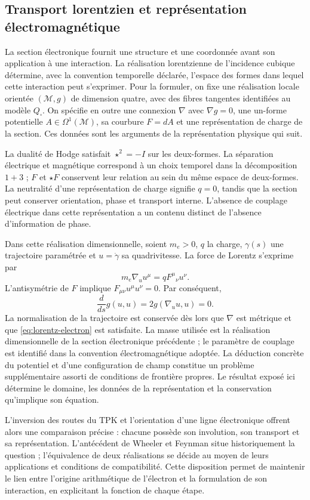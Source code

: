 \newpage
\subsection{Transport lorentzien et représentation électromagnétique}

La section électronique fournit une structure et une coordonnée
avant son application à une interaction. La réalisation lorentzienne
de l'incidence cubique détermine, avec la convention temporelle déclarée,
l'espace des formes dans lequel cette interaction peut s'exprimer.
Pour la formuler, on fixe une réalisation locale orientée \((\mathcal M,g)\)
de dimension quatre, avec des fibres tangentes identifiées au modèle
\(Q_\square\). On spécifie en outre une connexion \(\nabla\) avec
\(\nabla g=0\), une un-forme potentielle \(A\in\Omega^1(\mathcal M)\),
sa courbure \(F=dA\) et une représentation de charge de la section.
Ces données sont les arguments de la représentation physique qui suit.

La dualité de Hodge satisfait \(\star^2=-I\) sur les deux-formes. La séparation électrique et magnétique correspond à un choix temporel dans la décomposition \(1+3\) ; \(F\) et \(\star F\) conservent leur relation au sein du même espace de deux-formes. La neutralité d'une représentation de charge signifie \(q=0\), tandis que la section peut conserver orientation, phase et transport interne. L'absence de couplage électrique dans cette représentation a un contenu distinct de l'absence d'information de phase.

Dans cette réalisation dimensionnelle, soient \(m_e>0\), \(q\) la charge,
\(\gamma(s)\) une trajectoire paramétrée et \(u=\dot\gamma\)
sa quadrivitesse. La force de Lorentz s'exprime par
\begin{equation}
 m_e\nabla_u u^\mu=qF^\mu{}_{\nu}u^\nu.
 \label{eq:lorentz-electron}
\end{equation}
L'antisymétrie de \(F\) implique
\(F_{\mu\nu}u^\mu u^\nu=0\). Par conséquent,
\[
 \frac{d}{ds}g(u,u)=2g(\nabla_u u,u)=0.
\]
La normalisation de la trajectoire est conservée dès lors que \(\nabla\)
est métrique et que \eqref{eq:lorentz-electron} est satisfaite. La masse utilisée
est la réalisation dimensionnelle de la section électronique précédente ;
le paramètre de couplage est identifié dans la convention électromagnétique
adoptée. La déduction concrète du potentiel et d'une configuration
de champ constitue un problème supplémentaire assorti de conditions de frontière
propres. Le résultat exposé ici détermine le domaine, les données
de la représentation et la conservation qu'implique son équation.

L'inversion des routes du TPK et l'orientation d'une ligne électronique
offrent alors une comparaison précise : chacune possède son involution,
son transport et sa représentation. L'antécédent de Wheeler et Feynman
situe historiquement la question ; l'équivalence de deux réalisations
se décide au moyen de leurs applications et conditions de compatibilité.
Cette disposition permet de maintenir le lien entre l'origine arithmétique de l'électron
et la formulation de son interaction, en explicitant la fonction
de chaque étape.
